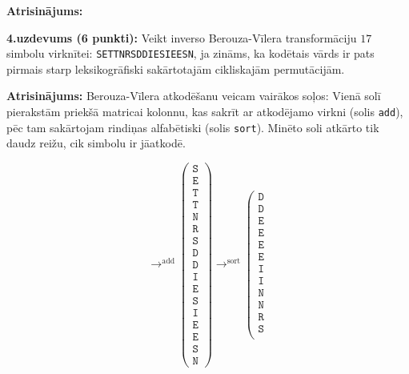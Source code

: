 \documentclass[11pt]{article}
\begin{document}
\vspace{6pt}
{\bf Atrisinājums:}


{\footnotesize
\vspace{6pt}
{\bf 4.uzdevums (6 punkti):}
Veikt inverso Berouza-Vīlera transformāciju $17$ simbolu virknītei: {\tt SETTNRSDDIESIEESN}, 
ja zināms, ka kodētais vārds ir pats pirmais starp leksikogrāfiski sakārtotajām cikliskajām permutācijām. 
} 

\vspace{6pt}
{\bf Atrisinājums:}
Berouza-Vīlera atkodēšanu veicam vairākos soļos: Vienā solī pierakstām priekšā matricai kolonnu, kas 
sakrīt ar atkodējamo virkni (solis {\tt add}), pēc tam 
sakārtojam rindiņas alfabētiski (solis {\tt sort}). Minēto soli atkārto tik daudz reižu, cik 
simbolu ir jāatkodē.

{\footnotesize
\[
\mathop{\longrightarrow}^{\text{add}}
\left(
\begin{array}{c}
\mathtt{S} \\
\mathtt{E} \\
\mathtt{T} \\
\mathtt{T} \\
\mathtt{N} \\
\mathtt{R} \\
\mathtt{S} \\
\mathtt{D} \\
\mathtt{D} \\
\mathtt{I} \\
\mathtt{E} \\
\mathtt{S} \\
\mathtt{I} \\
\mathtt{E} \\
\mathtt{E} \\
\mathtt{S} \\
\mathtt{N} 
\end{array} \right) 
\mathop{\longrightarrow}^{\text{sort}}
\left(
\begin{array}{c}
\mathtt{D} \\
\mathtt{D} \\
\mathtt{E} \\
\mathtt{E} \\
\mathtt{E} \\
\mathtt{E} \\
\mathtt{I} \\
\mathtt{I} \\
\mathtt{N} \\
\mathtt{N} \\
\mathtt{R} \\
\mathtt{S} \\

\end{array}\]}
\end{document}
